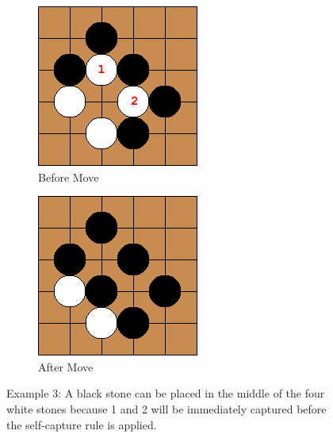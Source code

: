 \documentclass{l4proj}
\begin{document}
\begin{figure}[!ht]
\centering
\begin{subfigure}[b]{0.45\textwidth}
\includegraphics[width=\textwidth]{ex/Ex3-0.png}
\caption{Before Move}
\label{fig:ex3-0}
\end{subfigure}
\begin{subfigure}[b]{0.45\textwidth}
\includegraphics[width=\textwidth]{ex/Ex3-1.png}
\caption{After Move}
\label{fig:ex3-1}
\end{subfigure}
\caption{Example 3: A black stone can be placed in the middle of the four white stones because 1 and 2 will be immediately captured before the self-capture rule is applied. }
\label{fig:ex3}
\end{figure}
\end{document}
